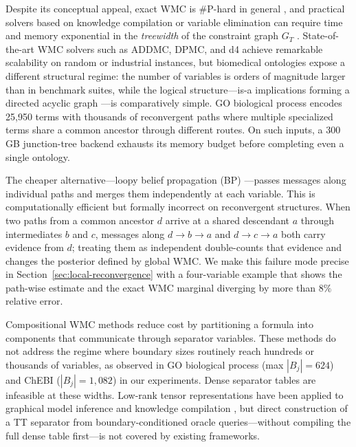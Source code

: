 \documentclass[12pt]{article}
\begin{document}
Despite its conceptual appeal, exact WMC is \#P-hard in general
\citep{valiant1979counting}, and practical solvers based on knowledge
compilation or variable elimination can require time and memory
exponential in the \emph{treewidth} of the constraint graph $G_T$
\citep{bodlaender1993treewidth,darwiche2002kcmap,darwiche2011sdd}.
State-of-the-art WMC solvers such as ADDMC, DPMC, and d4
\citep{dudek2020addmc,dudek2020dpmc,lagniez2017improved} achieve
remarkable scalability on random or industrial instances, but biomedical
ontologies expose a different structural regime: the number of variables
is orders of magnitude larger than in benchmark suites, while the
logical structure---is-a implications forming a directed acyclic graph
---is comparatively simple. GO biological process encodes 25,950 terms
with thousands of reconvergent paths where multiple specialized terms
share a common ancestor through different routes. On such inputs, a
300\,GB junction-tree backend exhausts its memory budget before
completing even a single ontology.

The cheaper alternative---loopy belief propagation (BP)
\citep{pearl1988probabilistic}---passes messages along individual paths
and merges them independently at each variable. This is computationally
efficient but formally incorrect on reconvergent structures. When two
paths from a common ancestor $d$ arrive at a shared descendant $a$
through intermediates $b$ and $c$, messages along $d \to b \to a$ and
$d \to c \to a$ both carry evidence from $d$; treating them as
independent double-counts that evidence and changes the posterior defined
by global WMC. We make this failure mode precise in
Section~\ref{sec:local-reconvergence} with a four-variable example
that shows the path-wise estimate and the exact WMC marginal diverging
by more than $8\%$ relative error.

Compositional WMC methods \citep{dal2017partitioned,dal2021compositional}
reduce cost by partitioning a formula into components that communicate
through separator variables. These methods do not address the regime
where boundary sizes routinely reach hundreds or thousands of variables,
as observed in GO biological process (max $|B_j| = 624$) and ChEBI
($|B_j| = 1{,}082$) in our experiments. Dense separator tables are
infeasible at these widths. Low-rank tensor representations have been
applied to graphical model inference
\citep{novikov2014mrf,wrigley2017tensorbp} and knowledge compilation
\citep{goral2024semiring,onaka2025ttkc}, but direct construction of a
TT separator from boundary-conditioned oracle queries---without compiling
the full dense table first---is not covered by existing frameworks.
\end{document}
